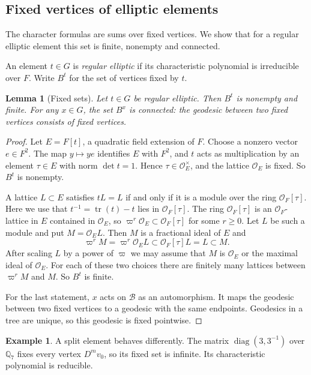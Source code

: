 \documentclass[12pt,letterpaper]{article}
\numberwithin{equation}{section}
\newtheorem{lemma}[theorem]{Lemma}
\theoremstyle{definition}
\newtheorem{example}[theorem]{Example}
\theoremstyle{remark}
\newcommand{\OO}{\mathcal O_F}
\newcommand{\OEr}{\mathcal O_E}
\newcommand{\tr}{\operatorname{tr}}
\newcommand{\diag}{\operatorname{diag}}
\newcommand{\BT}{\mathscr B}
\begin{document}
\subsection{Fixed vertices of elliptic elements}
The character formulas are sums over fixed vertices. We show that for a regular elliptic element this set is finite, nonempty and connected.

An element $t\in G$ is \emph{regular elliptic} if its characteristic polynomial is irreducible over $F$. Write $B^t$ for the set of vertices fixed by $t$.

\begin{lemma}[Fixed sets]\label{lem:fixedset}
Let $t\in G$ be regular elliptic. Then $B^t$ is nonempty and finite. For any $x\in G$, the set $B^x$ is connected: the geodesic between two fixed vertices consists of fixed vertices.
\end{lemma}
\begin{proof}
Let $E=F[t]$, a quadratic field extension of $F$. Choose a nonzero vector $e\in F^2$. The map $y\mapsto ye$ identifies $E$ with $F^2$, and $t$ acts as multiplication by an element $\tau\in E$ with norm $\det t=1$. Hence $\tau\in\OEr^\times$, and the lattice $\OEr$ is fixed. So $B^t$ is nonempty.

A lattice $L\subset E$ satisfies $tL=L$ if and only if it is a module over the ring $\OO[\tau]$. Here we use that $t^{-1}=\tr(t)-t$ lies in $\OO[\tau]$. The ring $\OO[\tau]$ is an $\OO$-lattice in $E$ contained in $\OEr$, so $\varpi^r\OEr\subset\OO[\tau]$ for some $r\ge0$. Let $L$ be such a module and put $M=\OEr L$. Then $M$ is a fractional ideal of $E$ and
\[
 \varpi^rM=\varpi^r\OEr L\subset\OO[\tau]L=L\subset M .
\]
After scaling $L$ by a power of $\varpi$ we may assume that $M$ is $\OEr$ or the maximal ideal of $\OEr$. For each of these two choices there are finitely many lattices between $\varpi^rM$ and $M$. So $B^t$ is finite.

For the last statement, $x$ acts on $\BT$ as an automorphism. It maps the geodesic between two fixed vertices to a geodesic with the same endpoints. Geodesics in a tree are unique, so this geodesic is fixed pointwise.
\end{proof}

\begin{example}
A split element behaves differently. The matrix $\diag(3,3^{-1})$ over $\mathbb Q_7$ fixes every vertex $D^mv_0$, so its fixed set is infinite. Its characteristic polynomial is reducible.
\end{example}
\end{document}
